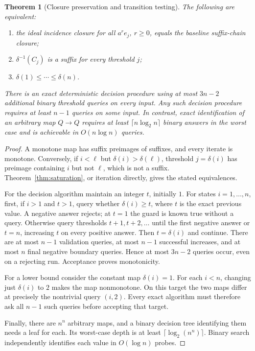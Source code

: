 \documentclass[11pt]{article}
\newtheorem{theorem}{Theorem}[section]
\theoremstyle{remark}
\begin{document}
\begin{theorem}[Closure preservation and transition testing]
\label{thm:threshold}
The following are equivalent:
\begin{enumerate}
\item the ideal incidence closure for all $a^re_j$, $r\ge0$, equals the baseline suffix-chain closure;
\item $\delta^{-1}(C_j)$ is a suffix for every threshold $j$;
\item $\delta(1)\le\cdots\le\delta(n)$.
\end{enumerate}
There is an exact deterministic decision procedure using at most $3n-2$ additional binary threshold queries on every input. Any such decision procedure requires at least $n-1$ queries on some input. In contrast, exact identification of an arbitrary map $Q\to Q$ requires at least $\lceil n\log_2n\rceil$ binary answers in the worst case and is achievable in $O(n\log n)$ queries.
\end{theorem}
\begin{proof}
A monotone map has suffix preimages of suffixes, and every iterate is monotone. Conversely, if $i<\ell$ but $\delta(i)>\delta(\ell)$, threshold $j=\delta(i)$ has preimage containing $i$ but not $\ell$, which is not a suffix. Theorem~\ref{thm:saturation}, or iteration directly, gives the stated equivalences.

For the decision algorithm maintain an integer $t$, initially $1$. For states $i=1,\ldots,n$, first, if $i>1$ and $t>1$, query whether $\delta(i)\ge t$, where $t$ is the exact previous value. A negative answer rejects; at $t=1$ the guard is known true without a query. Otherwise query thresholds $t+1,t+2,\ldots$ until the first negative answer or $t=n$, increasing $t$ on every positive answer. Then $t=\delta(i)$ and continue. There are at most $n-1$ validation queries, at most $n-1$ successful increases, and at most $n$ final negative boundary queries. Hence at most $3n-2$ queries occur, even on a rejecting run. Acceptance proves monotonicity.

For a lower bound consider the constant map $\delta(i)=1$. For each $i<n$, changing just $\delta(i)$ to $2$ makes the map nonmonotone. On this target the two maps differ at precisely the nontrivial query $(i,2)$. Every exact algorithm must therefore ask all $n-1$ such queries before accepting that target.

Finally, there are $n^n$ arbitrary maps, and a binary decision tree identifying them needs a leaf for each. Its worst-case depth is at least $\lceil\log_2(n^n)\rceil$. Binary search independently identifies each value in $O(\log n)$ probes.
\end{proof}
\end{document}

